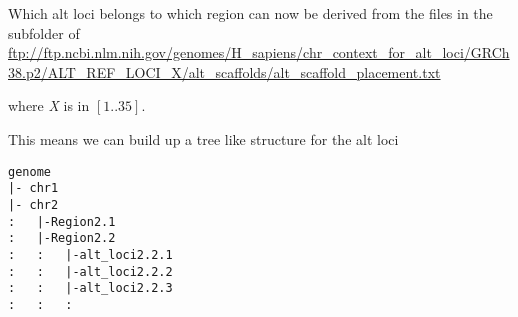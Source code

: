 \documentclass[10pt,a4paper]{article}
\begin{document}
Which alt loci belongs to which region can now be derived from the files in the
subfolder of  \\
\url{ftp://ftp.ncbi.nlm.nih.gov/genomes/H_sapiens/chr_context_for_alt_loci/GRCh38.p2/ALT_REF_LOCI_X/alt_scaffolds/alt_scaffold_placement.txt}

where \textit{X} is in $[1..35]$.

This means we can build up a tree like structure for the alt loci

\begin{verbatim}
genome
|- chr1
|- chr2
:   |-Region2.1
:   |-Region2.2
:   :   |-alt_loci2.2.1
:   :   |-alt_loci2.2.2
:   :   |-alt_loci2.2.3
:   :   :
\end{verbatim}
\end{document}
